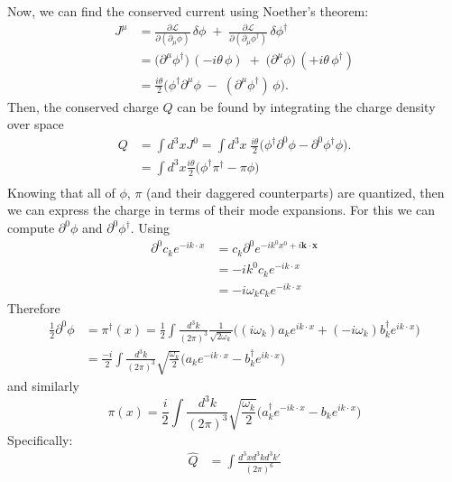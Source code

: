 \documentclass[12pt]{article}
\newcommand{\del}{\partial}
\begin{document}
Now, we can find the conserved current using Noether's theorem:
\begin{align*}
   J^\mu
   &= \frac{\partial \mathcal{L}}{\partial(\del_\mu \phi)}\,\delta\phi
     \;+\; \frac{\partial \mathcal{L}}{\partial(\del_\mu \phi^\dagger)}\,\delta\phi^\dagger \\
   &= \big(\del^\mu\phi^\dagger\big)\,(-i\theta\,\phi)
     \;+\; \big(\del^\mu\phi\big)\,(+i\theta\,\phi^\dagger) \\
   &= \frac{i\theta}{2}\Big(\phi^\dagger \del^\mu \phi \;-\; (\del^\mu\phi^\dagger)\,\phi\Big).
\end{align*}
Then, the conserved charge $Q$ can be found by integrating the charge density
over space
\begin{align*}
    Q &= \int d^3x J^{0} = \int d^3x \; \frac{i\theta}{2}\Big(\phi^\dagger \del^0 \phi -
    \del^0\phi^\dagger\phi\Big). \\
      &= \int d^3x \frac{i\theta}{2} \Big(\phi^{\dagger}\pi^{\dagger} - \pi\phi \Big) \\
\end{align*}
Knowing that all of $\phi$, $\pi$ (and their daggered counterparts) are quantized,
then we can express the charge in terms of their mode expansions. For this we
can compute $\del^0\phi$ and $\del^0\phi^{\dagger}$. Using 
\begin{align*}
    \del^0 c_k e^{-ik\cdot x} &= c_k \del^0 e^{-ik^0x^0 + i\mathbf{k} \cdot \mathbf{x}} \\
                              &= -i k^0 c_k e^{-ik\cdot x} \\
                              &= -i \omega_k c_k e^{-ik\cdot x}
\end{align*}
Therefore
\begin{align*}
    \tfrac12\del^0\phi &= \pi^{\dagger}(x) = \tfrac12 \int \frac{d^3k}{(2\pi)^3}
    \frac{1}{\sqrt{2\omega_k}} \Big((i\omega_k) a_k e^{ik\cdot x} +
    (-i\omega_k) b^{\dagger}_k e^{ik\cdot x} \Big) \\
                       &= \frac{-i}{2} \int \frac{d^3k}{(2\pi)^3}
                       \sqrt{\frac{\omega_k}{2}}\Big(a_ke^{-ik\cdot x}
                           - b^{\dagger}_ke^{ik\cdot x} \Big)
\end{align*}
and similarly
\begin{equation*}
    \pi(x) = \frac{i}{2} \int \frac{d^3k}{(2\pi)^3} \sqrt{\frac{\omega_k}{2}}
    \Big(a^{\dagger}_ke^{-ik\cdot x} - b_ke^{ik\cdot x} \Big)
\end{equation*}
Specifically:
\begin{align*}
    \hat{Q} &= \int \frac{d^3xd^3kd^3k'}{(2\pi)^6}
\end{align*}
\end{document}
